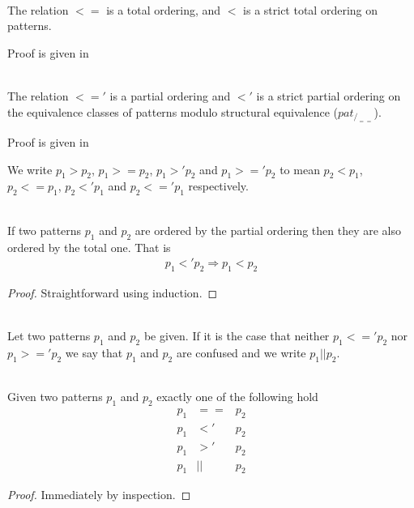 \begin{lemma}\ \\
  \label{lem:pat-total-orderings}
  The relation $<=$ is a total ordering, and $<$ is a strict total ordering on
  patterns.

  Proof is given in 
\end{lemma}


\begin{lemma}\ \\
  \label{lem:pat-partial-orderings}
  The relation $<='$ is a partial ordering and $<'$ is a strict partial ordering
  on the equivalence classes of patterns modulo structural equivalence
  ($pat_{/_{==}}$).

  Proof is given in 
\end{lemma}

We write $p_1 > p_2$, $p_1 >= p_2$, $p_1 >' p_2$ and $p_1 >=' p_2$ to mean $p_2
< p_1$, $p_2 <= p_1$, $p_2 <' p_1$ and $p_2 <=' p_1$ respectively.

\begin{lemma}[]\ \\
  \label{lem:total-implies-partial}
  If two patterns $p_1$ and $p_2$ are ordered by the partial ordering then they
  are also ordered by the total one. That is
  \begin{eqnarray*}
    p_1 <' p_2 \Longrightarrow p_1 < p_2
  \end{eqnarray*}
\end{lemma}
\begin{proof}
  Straightforward using induction.
\end{proof}

\begin{definition}[Confusion, $||$]\ \\
  \label{def:pat-confusion}
  Let two patterns $p_1$ and $p_2$ be given. If it is the case that neither $p_1
  <=' p_2$ nor $p_1 >=' p_2$ we say that $p_1$ and $p_2$ are confused and we
  write $p_1 || p_2$.
\end{definition}

\begin{lemma}\ \\
  \label{lem:unique-rel}
  Given two patterns $p_1$ and $p_2$ exactly one of the following hold
  \begin{eqnarray*}
    p_1 &==& p_2\\
    p_1 &<'& p_2\\
    p_1 &>'& p_2\\
    p_1 &||& p_2
  \end{eqnarray*}
\end{lemma}
\begin{proof}
  Immediately by inspection.
\end{proof}

